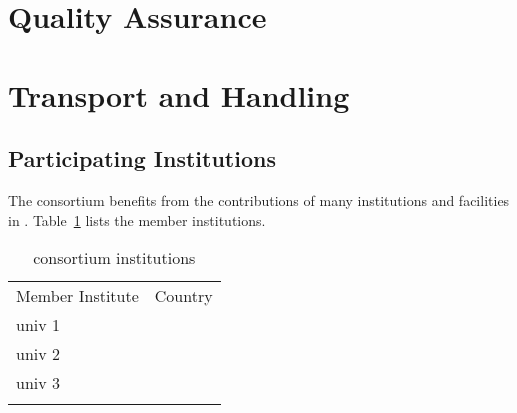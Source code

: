 \section{Quality Assurance}
\label{sec:int-inst-qa}

\section{Transport and Handling}
\label{sec:int-inst-transport}


\subsection{Participating Institutions}
\label{sec:fdsp-org-inst}

The  consortium benefits from the contributions of many institutions and facilities in .  Table~\ref{tab:int-inst-institutes}
lists the member institutions. 

\begin{longtable}
{ll}
\caption{ consortium institutions}\\ \colhline
\rowcolor{dunetablecolor} Member Institute  &  Country       \\  \toprowrule
univ 1 &  \\ \colhline
univ 2 &  \\ \colhline
univ 3 &  \\ 
\label{tab:int-inst-institutes}
\end{longtable}









